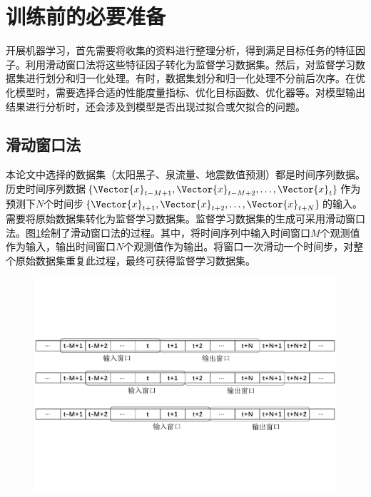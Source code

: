 \section{训练前的必要准备}\label{sec:ml_prepare}

开展机器学习，首先需要将收集的资料进行整理分析，得到满足目标任务的特征因子。利用滑动窗口法将这些特征因子转化为监督学习数据集。然后，对监督学习数据集进行划分和归一化处理。有时，数据集划分和归一化处理不分前后次序。在优化模型时，需要选择合适的性能度量指标、优化目标函数、优化器等。对模型输出结果进行分析时，还会涉及到模型是否出现过拟合或欠拟合的问题。

\subsection{滑动窗口法}\label{sec:ml_slide}

本论文中选择的数据集（太阳黑子、泉流量、地震数值预测）都是时间序列数据。历史时间序列数据$\{\Vector{x}_{t-M+1},\Vector{x}_{t-M+2},\ldots,\Vector{x}_{t}\}$作为预测下$N$个时间步$\{\Vector{x}_{t+1},\Vector{x}_{t+2},\ldots,\Vector{x}_{t+N}\}$的输入。需要将原始数据集转化为监督学习数据集。监督学习数据集的生成可采用滑动窗口法。图\ref{fig:slide_window}绘制了滑动窗口法的过程。其中，将时间序列中输入时间窗口$M$个观测值作为输入，输出时间窗口$N$个观测值作为输出。将窗口一次滑动一个时间步，对整个原始数据集重复此过程，最终可获得监督学习数据集。

\begin{figure}[!htbp]
  \centering
  \includegraphics[width=\textwidth]{Img/chap2_ml/slide_window.pdf}
  \label{fig:slide_window}
\end{figure}

